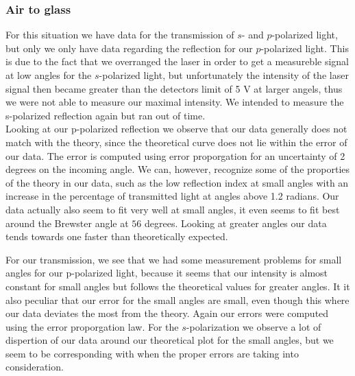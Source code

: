 \subsubsection{Air to glass}

For this situation we have data for the transmission of $s$- and $p$-polarized light, but only we only have data regarding the reflection for our $p$-polarized light. This is due to the fact that we overranged the laser in order to get a measureble signal at low angles for the $s$-polarized light, but unfortunately the intensity of the laser signal then became greater than the detectors limit of 5 V at larger angels, thus we were not able to measure our maximal intensity. We intended to measure the s-polarized reflection again but ran out of time.\\

Looking at our p-polarized reflection we observe that our data generally does not match with the theory, since the theoretical curve does not lie within the error of our data. The error is computed using error proporgation for an uncertainty of 2 degrees on the incoming angle. We can, however, recognize some of the proporties of the theory in our data, such as the low reflection index at small angles with an increase in the percentage of transmitted light at angles above 1.2 radians. Our data actually also seem to fit very well at small angles, it even seems to fit best around the Brewster angle at $56$ degrees. Looking at greater angles our data tends towards one faster than theoretically expected. 

For our transmission, we see that we had some measurement problems for small angles for our p-polarized light, because it seems that our intensity is almost constant for small angles but follows the theoretical values for greater angles. It it also peculiar that our error for the small angles are small, even though this where our data deviates the most from the theory. Again our errors were computed using the error proporgation law. For the $s$-polarization we observe a lot of dispertion of our data around our theoretical plot for the small angles, but we seem to be corresponding with when the proper errors are taking into consideration.


